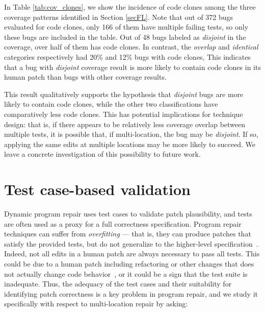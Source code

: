 \documentclass[10pt, conference]{IEEEtran}
\begin{document}
In Table \ref{tab:cov_clones}, we show the incidence of code clones among the three 
coverage patterns identified in Section \ref{secFL}. Note that out of 372 bugs evaluated for code clones, only 166 of them have multiple failing tests, so only these bugs are included in the table.  Out of 48 bugs labeled as 
\emph{disjoint} in the coverage, over half of them has code clones. In contrast, the 
\emph{overlap} and \emph{identical} categories respectively had 20\% and 12\% bugs with code clones, 
This indicates that a 
bug with \emph{disjoint} coverage result is more likely to contain code clones in its
human patch than bugs with other coverage results. 

This result qualitatively supports the hypothesis that \emph{disjoint} bugs are more likely to contain 
code clones, while the other two classifications have comparatively less code
clones. This has potential implications for technique design: that is, if there
appears to be relatively less coverage overlap between multiple tests, it is
possible that, if multi-location, the bug may be \emph{disjoint}.  If so,
applying the same edits at multiple locations may be more likely to succeed.  We
leave a concrete investigation of this possibility to future work.



\section{Test case-based validation}
\label{sec:tests}

Dynamic program repair uses test cases to validate patch plausibility, and tests are
often used as a proxy for a full correctness specification.  Program repair
techniques can suffer from \emph{overfitting} --- that is, they can produce
patches that satisfy the provided tests, but do not generalize to the
higher-level specification~\cite{Smith15fse}.  
%
Indeed, not all edits in a human patch are always necessary to pass all tests. This could be
due to a human patch including refactoring or other changes that does not actually
change code behavior~\cite{api-refactoring, tangledchanges}, or it could be a sign that the test
suite is inadequate.  
Thus, the adequacy of the test
cases and their suitability for identifying patch correctness is a key problem
in program repair, and we study it specifically with respect to multi-location
repair by asking:

\end{document}
